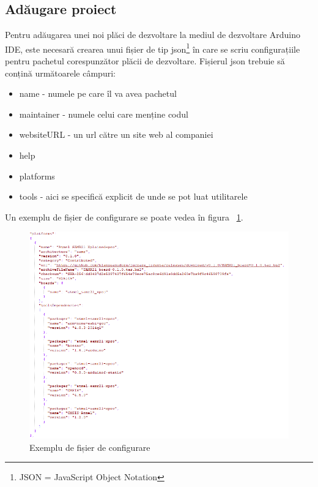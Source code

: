 \documentclass[12pt,a4paper]{report}
\begin{document}
\subsection{Adăugare proiect}
Pentru adăugarea unei noi plăci de dezvoltare la mediul de dezvoltare Arduino IDE, este necesară crearea unui fișier de tip json\footnote{JSON = JavaScript Object Notation} în care se scriu configurațiile pentru pachetul corespunzător plăcii de dezvoltare.
Fișierul json trebuie să conțină următoarele câmpuri:
\begin{itemize}
	\item{name - numele pe care îl va avea pachetul}
	\item{maintainer - numele celui care menține codul}
	\item{websiteURL - un url către un site web al companiei}
	\item{help}
	\item{platforms}
	\item{tools - aici se specifică explicit de unde se pot luat utilitarele}
\end{itemize}
Un exemplu de fișier de configurare se poate vedea în figura ~\ref{fig:json}.
\begin{figure}[!htb]
\centering
\includegraphics[scale=0.8]{pics/json.png}
  \caption{Exemplu de fișier de configurare}
  \label{fig:json}
\end{figure}
\end{document}
